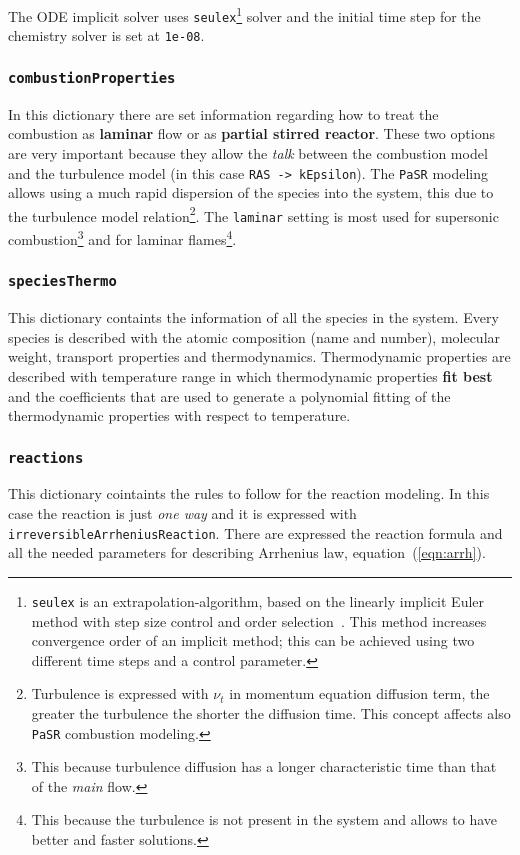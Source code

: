     The ODE implicit solver uses \verb|seulex|\cprotect\footnote{\verb|seulex| is an extrapolation-algorithm, based on the linearly implicit Euler method with step size control and order selection~\cite{wanner1996solving}. This method increases convergence order of an implicit method; this can be achieved using two different time steps and a control parameter.} solver and the initial time step for the chemistry solver is set at \verb|1e-08|. 
    \cprotect\subsubsection{\verb|combustionProperties|} \label{sec:PaSR}
    In this dictionary there are set information regarding how to treat the combustion as \textbf{laminar} flow or as \textbf{partial stirred reactor}. These two options are very important because they allow the \textit{talk} between the combustion model and the turbulence model (in this case \verb|RAS -> kEpsilon|). The \verb|PaSR| modeling allows using a much rapid dispersion of the species into the system, this due to the turbulence model relation\cprotect\footnote{Turbulence is expressed with $\nu_t$ in momentum equation diffusion term, the greater the turbulence the shorter the diffusion time. This concept affects also \verb|PaSR| combustion modeling.}. The \verb|laminar| setting is most used for supersonic combustion\footnote{This because turbulence diffusion has a longer characteristic time than that of the \textit{main} flow.} and for laminar flames\footnote{This because the turbulence is not present in the system and allows to have better and faster solutions.}.
    
    \cprotect\subsubsection{\verb|speciesThermo|} \label{sec:speciesThermo}
    This dictionary containts the information of all the species in the system. Every species is described with the atomic composition (name and number), molecular weight, transport properties and thermodynamics. Thermodynamic properties are described with temperature range in which thermodynamic properties \textbf{fit best} and the coefficients that are used to generate a polynomial fitting of the thermodynamic properties with respect to temperature.

    \cprotect\subsubsection{\verb|reactions|}
    This dictionary cointaints the rules to follow for the reaction modeling. In this case the reaction is just \textit{one way} and it is expressed with \verb|irreversibleArrheniusReaction|. There are expressed the reaction formula and all the needed parameters for describing Arrhenius law, equation~(\ref{eqn:arrh}).  

